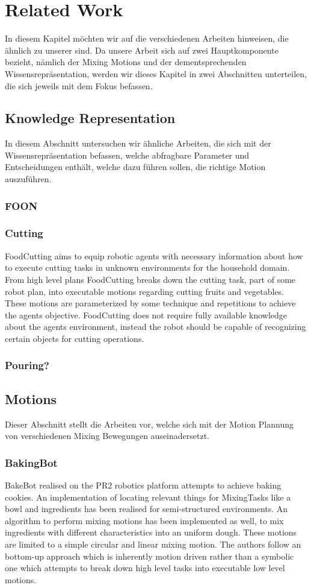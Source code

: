 \chapter{Related Work}
\label{chap:Related_work}

In diesem Kapitel möchten wir auf die verschiedenen Arbeiten hinweisen, die ähnlich zu unserer sind.
Da unsere Arbeit sich auf zwei Hauptkomponente bezieht, nämlich der Mixing Motions und der dementsprechenden Wissensrepräsentation, werden wir dieses Kapitel in zwei Abschnitten unterteilen, die sich jeweils mit dem Fokus befassen.
\section*{Knowledge Representation}
In diesem Abschnitt untersuchen wir ähnliche Arbeiten, die sich mit der Wissensrepräsentation befassen, welche abfragbare Parameter und Entscheidungen enthält, welche dazu führen sollen, die richtige Motion auszuführen.
\subsection*{FOON}
\subsection*{Cutting}
FoodCutting aims to equip robotic agents with necessary information about how to 
execute  cutting tasks in unknown environments for the household domain. From high level plans FoodCutting breaks down 
the cutting task, part of some robot plan, into executable motions regarding cutting fruits and vegetables. These motions are parameterized 
by some technique and repetitions to achieve the agents objective. 
FoodCutting does not require fully available knowledge
about the agents environment, instead the robot should be capable of recognizing certain objects for cutting 
operations. 
\subsection*{Pouring?}
\section*{Motions}
Dieser Abschnitt stellt die Arbeiten vor, welche sich mit der Motion Plannung von verschiedenen Mixing Bewegungen auseinadersetzt.
\subsection*{BakingBot}
BakeBot realised on the PR2 robotics platform attempts to achieve baking cookies. An implementation of locating relevant things for MixingTasks
like a bowl and ingredients has been realised for semi-structured environments. An algorithm to perform mixing motions has been implemented as well, to mix 
ingredients with different characteristics into an uniform dough. These motions are limited to a simple circular and linear mixing motion.
The authors follow an bottom-up approach which is inherently motion driven rather than a
symbolic one which attempts to break down high level tasks into executable low level motions. 

